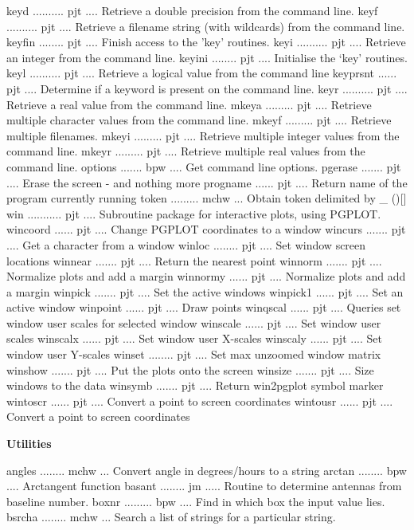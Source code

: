 {\eightpoint\begintt
keyd .......... pjt .... Retrieve a double precision from the command line.
keyf .......... pjt .... Retrieve a filename string (with wildcards) from the command line.
keyfin ........ pjt .... Finish access to the 'key' routines.
keyi .......... pjt .... Retrieve an integer from the command line.
keyini ........ pjt .... Initialise the `key' routines.
\endtt}
{\eightpoint\begintt
keyl .......... pjt .... Retrieve a logical value from the command line
keyprsnt ...... pjt .... Determine if a keyword is present on the command line.
keyr .......... pjt .... Retrieve a real value from the command line.
mkeya ......... pjt .... Retrieve multiple character values from the command line.
mkeyf ......... pjt .... Retrieve multiple filenames.
\endtt}
{\eightpoint\begintt
mkeyi ......... pjt .... Retrieve multiple integer values from the command line.
mkeyr ......... pjt .... Retrieve multiple real values from the command line.
options ....... bpw .... Get command line options.
pgerase ....... pjt .... Erase the screen - and nothing more
progname ...... pjt .... Return name of the program currently running
\endtt}
{\eightpoint\begintt
token ......... mchw ... Obtain token delimited by _ ()[]
win ........... pjt .... Subroutine package for interactive plots, using PGPLOT.
wincoord ...... pjt .... Change PGPLOT coordinates to a window
wincurs ....... pjt .... Get a character from a window
winloc ........ pjt .... Set window screen locations
\endtt}
{\eightpoint\begintt
winnear ....... pjt .... Return the nearest point
winnorm ....... pjt .... Normalize plots and add a margin
winnormy ...... pjt .... Normalize plots and add a margin
winpick ....... pjt .... Set the active windows
winpick1 ...... pjt .... Set an active window
\endtt}
{\eightpoint\begintt
winpoint ...... pjt .... Draw points
winqscal ...... pjt .... Queries set window user scales for selected window
winscale ...... pjt .... Set window user scales
winscalx ...... pjt .... Set window user X-scales
winscaly ...... pjt .... Set window user Y-scales
\endtt}
{\eightpoint\begintt
winset ........ pjt .... Set max unzoomed window matrix
winshow ....... pjt .... Put the plots onto the screen
winsize ....... pjt .... Size windows to the data
winsymb ....... pjt .... Return win2pgplot symbol marker
wintoscr ...... pjt .... Convert a point to screen coordinates
\endtt}
{\eightpoint\begintt
wintousr ...... pjt .... Convert a point to screen coordinates
\endtt}
\par\centerline{\bf Utilities}
{\eightpoint\begintt
angles ........ mchw ... Convert angle in degrees/hours to a string
arctan ........ bpw .... Arctangent function
basant ........ jm ..... Routine to determine antennas from baseline number.
boxnr ......... bpw .... Find in which box the input value lies.
bsrcha ........ mchw ... Search a list of strings for a particular string.
\endtt}
